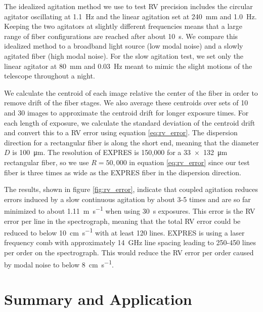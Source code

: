\documentclass[twocolumn]{emulateapj}
\begin{document}
The idealized agitation method we use to test RV precision includes the circular agitator oscillating at \SI{1.1}{\hertz} and the linear agitation set at \SI{240}{\milli\meter} and \SI{1.0}{\hertz}. Keeping the two agitators at slightly different frequencies means that a large range of fiber configurations are reached after about \SI{10}{\second}. We compare this idealized method to a broadband light source (low modal noise) and a slowly agitated fiber (high modal noise). For the slow agitation test, we set only the linear agitator at \SI{80}{\milli\meter} and \SI{0.03}{\hertz} meant to mimic the slight motions of the telescope throughout a night.

We calculate the centroid of each image relative the center of the fiber in order to remove drift of the fiber stages. We also average these centroids over sets of 10 and 30 images to approximate the centroid drift for longer exposure times. For each length of exposure, we calculate the standard deviation of the centroid drift and convert this to a RV error using equation \ref{eq:rv_error}. The dispersion direction for a rectangular fiber is along the short end, meaning that the diameter $D$ is \SI{100}{\micro\meter}. The resolution of EXPRES is 150,000 for a \SI{33x132}{\micro\meter} rectangular fiber, so we use $R=50,000$ in equation \ref{eq:rv_error} since our test fiber is three times as wide as the EXPRES fiber in the dispersion direction.

The results, shown in figure \ref{fig:rv_error}, indicate that coupled agitation reduces errors induced by a slow continuous agitation by about 3-5 times and are so far minimized to about \SI{1.11}{\meter\per\second} when using \SI{30}{\second} exposures. This error is the RV error per line in the spectrograph, meaning that the total RV error could be reduced to below \SI{10}{\centi\meter\per\second} with at least 120 lines. EXPRES is using a laser frequency comb with approximately \SI{14}{\giga\hertz} line spacing leading to 250-450 lines per order on the spectrograph. This would reduce the RV error per order caused by modal noise to below \SI{8}{\centi\meter\per\second}.

\section{Summary and Application}
\label{sec:conclusions}
\end{document}
